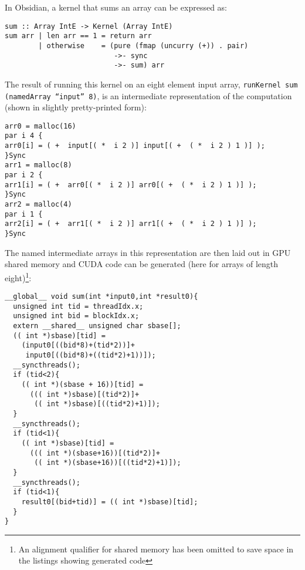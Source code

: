 In Obsidian, a kernel that sums an array can be expressed as: 
\begin{codesize}
\begin{verbatim}
sum :: Array IntE -> Kernel (Array IntE) 
sum arr | len arr == 1 = return arr
        | otherwise    = (pure (fmap (uncurry (+)) . pair) 
                          ->- sync 
                          ->- sum) arr                       
\end{verbatim}
\end{codesize}
The result of running this kernel on an eight element input array, 
{\tt runKernel sum (namedArray ``input'' 8)}, is an intermediate representation 
of the computation (shown in slightly pretty-printed form): 
\begin{codesize}
\begin{verbatim}
arr0 = malloc(16)
par i 4 {
arr0[i] = ( +  input[( *  i 2 )] input[( +  ( *  i 2 ) 1 )] );
}Sync
arr1 = malloc(8)
par i 2 {
arr1[i] = ( +  arr0[( *  i 2 )] arr0[( +  ( *  i 2 ) 1 )] );
}Sync
arr2 = malloc(4)
par i 1 {
arr2[i] = ( +  arr1[( *  i 2 )] arr1[( +  ( *  i 2 ) 1 )] );
}Sync
\end{verbatim}
\end{codesize}
The named intermediate arrays in this representation are then laid 
out in GPU shared memory and CUDA code can be generated (here for arrays of length eight)\footnote{An alignment qualifier for shared memory 
has been omitted to save space in the listings showing generated code}: 
\begin{codesize}
\begin{verbatim}
__global__ void sum(int *input0,int *result0){
  unsigned int tid = threadIdx.x;
  unsigned int bid = blockIdx.x;
  extern __shared__ unsigned char sbase[];
  (( int *)sbase)[tid] = 
    (input0[((bid*8)+(tid*2))]+
     input0[((bid*8)+((tid*2)+1))]);
  __syncthreads();
  if (tid<2){
    (( int *)(sbase + 16))[tid] = 
      ((( int *)sbase)[(tid*2)]+
       (( int *)sbase)[((tid*2)+1)]);
  }
  __syncthreads();
  if (tid<1){
    (( int *)sbase)[tid] = 
      ((( int *)(sbase+16))[(tid*2)]+
       (( int *)(sbase+16))[((tid*2)+1)]);
  }
  __syncthreads();
  if (tid<1){
    result0[(bid+tid)] = (( int *)sbase)[tid];
  }
}
\end{verbatim}
\end{codesize}



